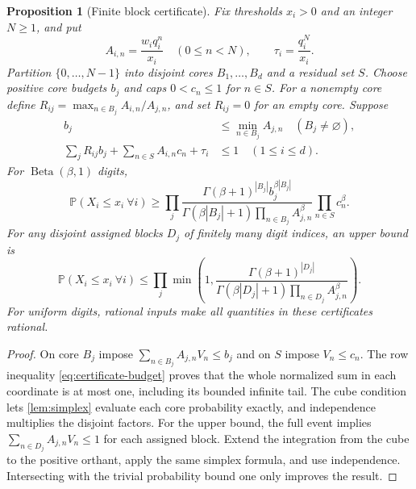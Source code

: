 \documentclass[11pt,a4paper]{article}
\newtheorem{proposition}[theorem]{Proposition}
\theoremstyle{definition}
\theoremstyle{remark}
\newcommand{\PP}{\mathbb P}
\numberwithin{equation}{section}
\begin{document}
\begin{proposition}[Finite block certificate]
\label{prop:certificate}
Fix thresholds $x_i>0$ and an integer $N\ge1$, and put
\[
 A_{i,n}=\frac{w_iq_i^n}{x_i}\quad(0\le n<N),\qquad
 \tau_i=\frac{q_i^N}{x_i}.
\]
Partition $\{0,\ldots,N-1\}$ into disjoint cores $B_1,\ldots,B_d$
and a residual set $S$. Choose positive core budgets $b_j$ and caps
$0<c_n\le1$ for $n\in S$. For a nonempty core define
$R_{ij}=\max_{n\in B_j}A_{i,n}/A_{j,n}$, and set $R_{ij}=0$ for an
empty core. Suppose
\begin{align}
 b_j&\le\min_{n\in B_j}A_{j,n}\quad(B_j\ne\varnothing),
 \label{eq:certificate-cube}\\
 \sum_jR_{ij}b_j+\sum_{n\in S}A_{i,n}c_n+\tau_i&\le1
 \quad(1\le i\le d).
 \label{eq:certificate-budget}
\end{align}
For $\operatorname{Beta}(\beta,1)$ digits,
\begin{equation}
 \PP(X_i\le x_i\ \forall i)\ge
 \prod_j\frac{\Gamma(\beta+1)^{|B_j|}b_j^{\beta|B_j|}}
 {\Gamma(\beta|B_j|+1)\prod_{n\in B_j}A_{j,n}^\beta}
 \prod_{n\in S}c_n^\beta.
 \label{eq:certificate-lower}
\end{equation}
For any disjoint assigned blocks $D_j$ of finitely many digit indices,
an upper bound is
\begin{equation}
 \PP(X_i\le x_i\ \forall i)\le
 \prod_j\min\left(1,
 \frac{\Gamma(\beta+1)^{|D_j|}}
 {\Gamma(\beta|D_j|+1)\prod_{n\in D_j}A_{j,n}^\beta}\right).
 \label{eq:certificate-upper}
\end{equation}
For uniform digits, rational inputs make all quantities in these
certificates rational.
\end{proposition}
\begin{proof}
On core $B_j$ impose $\sum_{n\in B_j}A_{j,n}V_n\le b_j$ and on
$S$ impose $V_n\le c_n$. The row inequality
\eqref{eq:certificate-budget} proves that the whole normalized sum in
each coordinate is at most one, including its bounded infinite tail.
The cube condition lets \cref{lem:simplex} evaluate each core probability
exactly, and independence multiplies the disjoint factors. For the upper
bound, the full event implies
$\sum_{n\in D_j}A_{j,n}V_n\le1$ for each assigned block. Extend the
integration from the cube to the positive orthant, apply the same simplex
formula, and use independence. Intersecting with the trivial probability
bound one only improves the result.
\end{proof}
\end{document}
